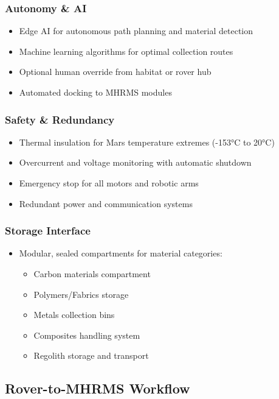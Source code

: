 \documentclass[12pt, a4paper]{article}
\begin{document}
\subsubsection{Autonomy \& AI}
\begin{itemize}
    \item Edge AI for autonomous path planning and material detection
    \item Machine learning algorithms for optimal collection routes
    \item Optional human override from habitat or rover hub
    \item Automated docking to MHRMS modules
\end{itemize}

\subsubsection{Safety \& Redundancy}
\begin{itemize}
    \item Thermal insulation for Mars temperature extremes (-153°C to 20°C)
    \item Overcurrent and voltage monitoring with automatic shutdown
    \item Emergency stop for all motors and robotic arms
    \item Redundant power and communication systems
\end{itemize}

\subsubsection{Storage Interface}
\begin{itemize}
    \item Modular, sealed compartments for material categories:
    \begin{itemize}
        \item Carbon materials compartment
        \item Polymers/Fabrics storage
        \item Metals collection bins
        \item Composites handling system
        \item Regolith storage and transport
    \end{itemize}
\end{itemize}

\subsection{Rover-to-MHRMS Workflow}
\end{document}
